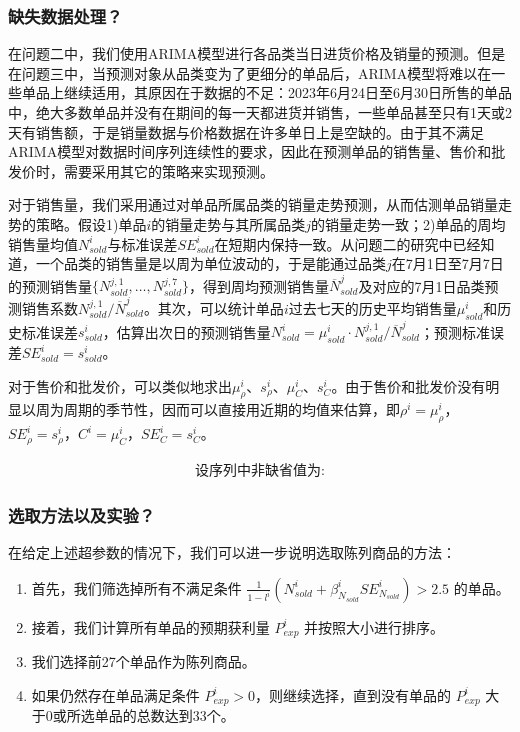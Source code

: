 \documentclass[withoutpreface,bwprint]{cumcmthesis} %
\begin{document}
\subsubsection{缺失数据处理？}

在问题二中，我们使用ARIMA模型进行各品类当日进货价格及销量的预测。但是在问题三中，当预测对象从品类变为了更细分的单品后，ARIMA模型将难以在一些单品上继续适用，其原因在于数据的不足：2023年6月24日至6月30日所售的单品中，绝大多数单品并没有在期间的每一天都进货并销售，一些单品甚至只有1天或2天有销售额，于是销量数据与价格数据在许多单日上是空缺的。由于其不满足ARIMA模型对数据时间序列连续性的要求，因此在预测单品的销售量、售价和批发价时，需要采用其它的策略来实现预测。

对于销售量，我们采用通过对单品所属品类的销量走势预测，从而估测单品销量走势的策略。假设1)单品$i$的销量走势与其所属品类$j$的销量走势一致；2)单品的周均销售量均值$N_{sold}^i$与标准误差$SE_{sold}^i$在短期内保持一致。从问题二的研究中已经知道，一个品类的销售量是以周为单位波动的，于是能通过品类$j$在7月1日至7月7日的预测销售量$\{N_{sold}^{j,1}, \dots, N_{sold}^{j, 7}\}$，得到周均预测销售量$\overline{N}_{sold}^j$及对应的7月1日品类预测销售系数$N_{sold}^{j,1}/\overline{N}_{sold}^j$。其次，可以统计单品$i$过去七天的历史平均销售量$\mu^i_{sold}$和历史标准误差$s^i_{sold}$，估算出次日的预测销售量$N^i_{sold} = \mu^i_{sold} \cdot N_{sold}^{j,1}/\overline{N}_{sold}^j$；预测标准误差$SE^i_{sold}=s^i_{sold}$。

对于售价和批发价，可以类似地求出$\mu^i_{\rho}$、$s^i_{\rho}$、$\mu^i_{C}$、$s^i_{C}$。由于售价和批发价没有明显以周为周期的季节性，因而可以直接用近期的均值来估算，即$\rho^i = \mu^i_{\rho}$，$SE^i_\rho = s^i_\rho$，$C^i = \mu^i_C$，$SE^i_C = s^i_C$。

\begin{align}
    \textbf{设序列中非缺省值为:}
\end{align}
\subsubsection{选取方法以及实验？}
在给定上述超参数的情况下，我们可以进一步说明选取陈列商品的方法：
\begin{enumerate}
    \item  首先，我们筛选掉所有不满足条件 $\frac{1}{1-l^i}(N_{sold}^i+\beta_{N_{sold}}^iSE_{N_{sold}}^i)>2.5$ 的单品。
    \item 接着，我们计算所有单品的预期获利量 $P_{exp}^i$ 并按照大小进行排序。
    \item 我们选择前27个单品作为陈列商品。
    \item 如果仍然存在单品满足条件 $P_{exp}^i>0$，则继续选择，直到没有单品的 $P_{exp}^i$ 大于0或所选单品的总数达到33个。
\end{enumerate}
\end{document}
